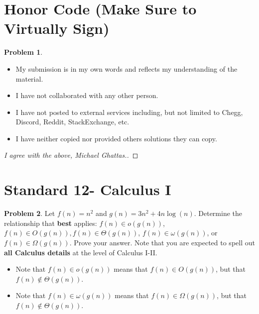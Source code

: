 \documentclass[11pt]{article}
\theoremstyle{definition}
\theoremstyle{definition}
\newtheorem{required}{Problem}
\theoremstyle{definition}
\begin{document}
\section{Honor Code (Make Sure to Virtually Sign)} \label{HonorCode}

\begin{required}
\noindent 
\begin{itemize}
\item My submission is in my own words and reflects my understanding of the material.
\item I have not collaborated with any other person.
\item I have not posted to external services including, but not limited to Chegg, Discord, Reddit, StackExchange, etc.
\item I have neither copied nor provided others solutions they can copy.
\end{itemize}

\end{required}

\begin{proof}[I agree with the above, Michael Ghattas.]
\end{proof}



\newpage
\section{Standard 12- Calculus I}

\begin{required} \label{Problem2}
Let $f(n) = n^{2}$ and $g(n) = 3n^{2} + 4n \log(n)$. Determine the relationship that \textbf{best} applies: $f(n) \in o(g(n))$, $f(n) \in O(g(n)), f(n) \in \Theta(g(n))$, $f(n) \in \omega(g(n))$, or $f(n) \in \Omega(g(n))$. Prove your answer. Note that you are expected to spell out \textbf{all Calculus details} at the level of Calculus I-II.
\begin{itemize}
\item Note that $f(n) \in o(g(n))$ means that $f(n) \in O(g(n))$, but that $f(n) \not \in \Theta(g(n))$.
\item Note that $f(n) \in \omega(g(n))$ means that $f(n) \in \Omega(g(n))$, but that $f(n) \not \in \Theta(g(n))$.
\end{itemize}
\end{required}
\end{document}
